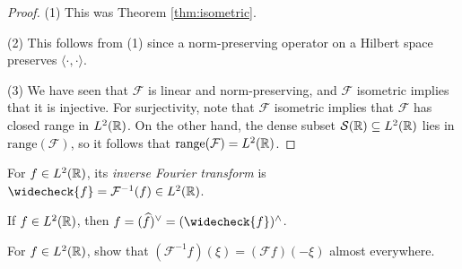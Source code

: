 \begin{proof}
  (1) This was Theorem \ref{thm:isometric}.

  (2) This follows from (1) since a norm-preserving
  operator on a Hilbert space preserves
  $\langle \cdot, \cdot \rangle$.

  (3) We have seen that $\mathcal{F}$ is linear and
  norm-preserving, and $\mathcal{F}$ isometric
  implies that it is injective. For surjectivity, note
  that $\mathcal{F}$ isometric implies that
  $\mathcal{F}$ has closed range in $L^2(\mathbb{R})$.
  On the other hand, the dense subset
  $\mathcal{S}(\mathbb{R}) \subseteq L^2(\mathbb{R})$ lies in $\mathrm{range}(\mathcal{F})$,
  so it follows that
  $\mathrm{range}(\mathcal{F}) = L^2(\mathbb{R})$.
\end{proof}

\begin{definition}
  For $f \in L^2(\mathbb{R})$, its \emph{inverse Fourier transform}
  is $\widecheck{f} = \mathcal{F}^{-1}(f) \in L^2(\R)$.
\end{definition}

\begin{corollary}
  If $f \in L^2(\mathbb{R})$, then
  $f = (\widehat{f})^\vee = (\widecheck{f})^\wedge$.
\end{corollary}

\begin{exercise}
  For $f \in L^2(\mathbb{R})$, show that
  $(\mathcal{F}^{-1} f)(\xi) = (\mathcal{F} f)(-\xi)$
  almost everywhere.
\end{exercise}
